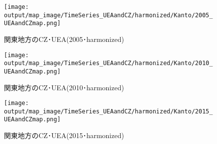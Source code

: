 \documentclass{ltjsarticle}
\begin{document}
  \begin{figure}[pbth]
    \centering
    \texttt{[image: output/map\_image/TimeSeries\_UEAandCZ/harmonized/Kanto/2005\_UEAandCZmap.png]}
    \caption{\label{ham:tsK2005}関東地方のCZ･UEA(2005･harmonized)}
  \end{figure}
  
  \begin{figure}[pbth]
    \centering
    \texttt{[image: output/map\_image/TimeSeries\_UEAandCZ/harmonized/Kanto/2010\_UEAandCZmap.png]}
    \caption{\label{ham:tsK2010}関東地方のCZ･UEA(2010･harmonized)}
  \end{figure}
  
  \begin{figure}[pbth]
    \centering
    \texttt{[image: output/map\_image/TimeSeries\_UEAandCZ/harmonized/Kanto/2015\_UEAandCZmap.png]}
    \caption{\label{ham:tsK2015}関東地方のCZ･UEA(2015･harmonized)}
  \end{figure}
  
\clearpage
\end{document}

